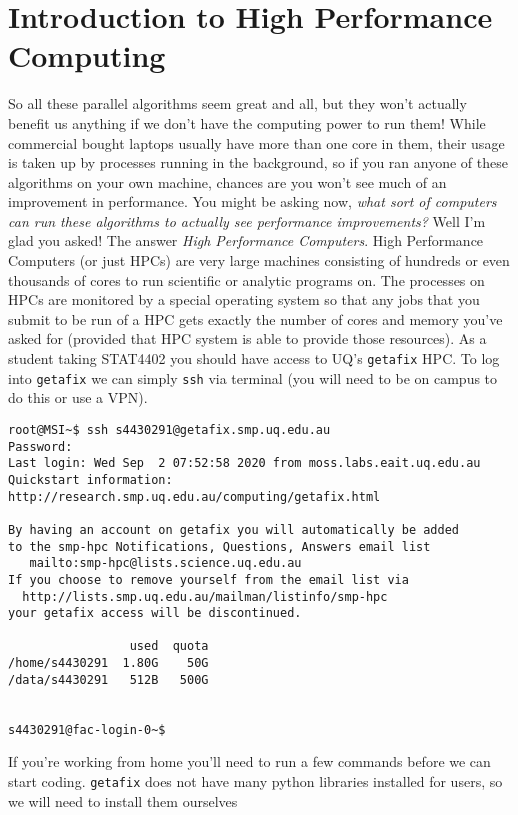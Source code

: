 \section{Introduction to High Performance Computing}

So all these parallel algorithms seem great and all, but they won't actually benefit us anything if we don't have the computing power to run them! While commercial bought laptops usually have more than one core in them, their usage is taken up by processes running in the background, so if you ran anyone of these algorithms on your own machine, chances are you won't see much of an improvement in performance. You might be asking now, {\it what sort of computers can run these algorithms to actually see performance improvements?} Well I'm glad you asked! The answer {\it High Performance Computers}. High Performance Computers (or just HPCs) are very large machines consisting of hundreds or even thousands of cores to run scientific or analytic programs on. The processes on HPCs are monitored by a special operating system so that any jobs that you submit to be run of a HPC gets exactly the number of cores and memory you've asked for (provided that HPC system is able to provide those resources). As a student taking STAT4402 you should have access to UQ's \texttt{getafix} HPC. To log into \texttt{getafix} we can simply \texttt{ssh} via terminal (you will need to be on campus to do this or use a VPN).
\begin{verbatim}
root@MSI~$ ssh s4430291@getafix.smp.uq.edu.au
Password:
Last login: Wed Sep  2 07:52:58 2020 from moss.labs.eait.uq.edu.au
Quickstart information: http://research.smp.uq.edu.au/computing/getafix.html

By having an account on getafix you will automatically be added
to the smp-hpc Notifications, Questions, Answers email list
   mailto:smp-hpc@lists.science.uq.edu.au
If you choose to remove yourself from the email list via
  http://lists.smp.uq.edu.au/mailman/listinfo/smp-hpc
your getafix access will be discontinued.

                 used  quota
/home/s4430291  1.80G    50G
/data/s4430291   512B   500G


s4430291@fac-login-0~$
\end{verbatim}

If you're working from home you'll need to run a few commands before we can start coding. \texttt{getafix} does not have many python libraries installed for users, so we will need to install them ourselves

